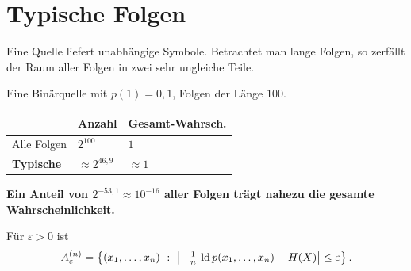\section{Typische Folgen}

\begin{merksatz}
Eine Quelle liefert unabhängige Symbole. Betrachtet man lange Folgen, so zerfällt der Raum aller Folgen in zwei sehr ungleiche Teile.

Eine Binärquelle mit $p(1) = 0{,}1$, Folgen der Länge $100$.

\begin{center}
{\small
\renewcommand{\arraystretch}{1.5}
\begin{tabular}{@{}P{2.6cm}P{2.4cm}P{2.6cm}@{}}
\toprule
& \textbf{Anzahl} & \textbf{Gesamt-Wahrsch.}\\
\midrule
Alle Folgen & $2^{100}$ & $1$\\
\textbf{Typische} & $\approx 2^{46{,}9}$ & $\approx 1$\\
\bottomrule
\end{tabular}}
\end{center}

\begin{center}
\begin{minipage}{0.9\textwidth}
\textbf{Ein Anteil von $2^{-53{,}1} \approx 10^{-16}$ aller Folgen trägt nahezu die gesamte Wahrscheinlichkeit.}
\end{minipage}
\end{center}

\begin{center}
\begin{minipage}{0.88\textwidth}
\end{minipage}
\end{center}
\end{merksatz}

\begin{definition}
Für $\varepsilon > 0$ ist
\[ A_\varepsilon^{(n)} = \left\{ (x_1,\ldots,x_n) \ : \ \left|-\tfrac1n\,\operatorname{ld} p(x_1,\ldots,x_n) - H(X)\right| \le \varepsilon \right\} . \]
\end{definition}

